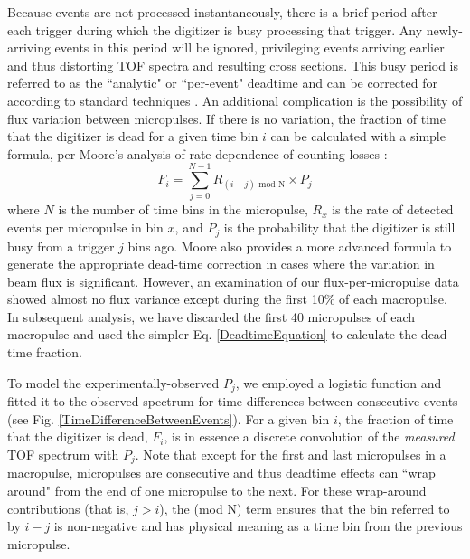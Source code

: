 \documentclass[twocolumn,secnumarabic,amssymb, nobibnotes, aps, prl,
superscriptaddress, nobalancelastpage]{revtex4}
\begin{document}
Because events are not processed instantaneously, there is a brief period
after each trigger during which the digitizer is busy processing that trigger.
Any newly-arriving events in this period will be ignored,
privileging events arriving earlier and thus distorting
TOF spectra and resulting cross sections. This busy period is referred to as the
``analytic" or ``per-event" deadtime and can be corrected for according to standard 
techniques
\cite{Moore1980}. An additional complication is the possibility of flux
variation between micropulses. If there is no variation, the fraction of time
that the digitizer is dead for a given time bin $i$ can be calculated with a
simple formula, per Moore's analysis of rate-dependence of counting losses
\cite{Moore1980}:
\begin{equation}
    F_{i} = \sum^{N-1}_{j=0} R_{(i-j)\text{ mod N}}\times P_{j}
    \label{DeadtimeEquation}
\end{equation}
where $N$ is the number of time bins in the micropulse, $R_{x}$ is the rate of
detected events per micropulse in bin $x$, and $P_{j}$ is the probability that the
digitizer is still busy from a trigger $j$ bins ago.
Moore also provides a more advanced formula to generate the appropriate
dead-time correction in cases where the variation in beam flux 
is significant. However, an examination of our flux-per-micropulse data showed
almost no flux variance except during the first 10\%
of each macropulse. In subsequent analysis, we have discarded the first 40 micropulses of each 
macropulse and used the simpler Eq. \ref{DeadtimeEquation} to calculate the dead
time fraction.

To model the experimentally-observed $P_{j}$, we
employed a logistic function and fitted it to the observed spectrum for time
differences between consecutive events (see Fig.
\ref{TimeDifferenceBetweenEvents}). For a given bin $i$, the fraction of time that the 
digitizer is dead, $F_{i}$, is in essence a discrete convolution of the
\textit{measured} TOF spectrum with $P_{j}$. Note that except for the first and
last micropulses in a macropulse, micropulses are consecutive and thus deadtime effects can
``wrap around" from the end of one micropulse to the next. For these wrap-around
contributions (that is, $j>i$), the (mod N) term ensures that the bin referred
to by $i-j$ is non-negative and has physical meaning as a time bin from the previous 
micropulse.
\end{document}
